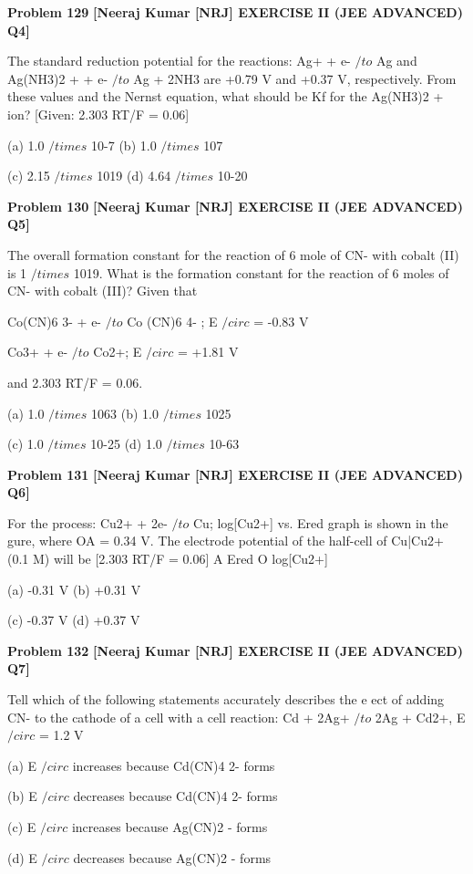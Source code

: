 \begin{problembox}
\textbf{Problem 129} \hfill \textbf{[Neeraj Kumar [NRJ] EXERCISE II (JEE ADVANCED) Q4]}
\label{q:ext-nrj_all_questions-129}

The 
standard 
reduction 
potential 
for 
the 
reactions: Ag+ + e- $/to$ Ag and Ag(NH3)2
+  + e- $/to$ 
Ag + 2NH3 are +0.79 V and +0.37 V, respectively. 
From these values and the Nernst equation, what 
should be Kf for the Ag(NH3)2
+ ion? [Given: 2.303
RT/F = 0.06]
 
 (a) 1.0 $/times$ 10-7 
(b) 1.0 $/times$ 107
 
 (c) 2.15 $/times$ 1019 
(d) 4.64 $/times$ 10-20
\end{problembox}

\begin{problembox}
\textbf{Problem 130} \hfill \textbf{[Neeraj Kumar [NRJ] EXERCISE II (JEE ADVANCED) Q5]}
\label{q:ext-nrj_all_questions-130}

The overall formation constant for the reaction of 
6 mole of CN- with cobalt (II) is 1 $/times$ 1019. What is 
the formation constant for the reaction of 6 moles 
of CN- with cobalt (III)? Given that
 
   Co(CN)6
3- + e- $/to$ Co (CN)6
4- ; E $/circ$ = -0.83 V
 
   Co3+ + e- $/to$ Co2+; E $/circ$ = +1.81 V
 
  and 2.303 RT/F = 0.06.
 
 (a) 1.0 $/times$ 1063 
(b) 1.0 $/times$ 1025
 
 (c) 1.0 $/times$ 10-25 
(d) 1.0 $/times$ 10-63
\end{problembox}

\begin{problembox}
\textbf{Problem 131} \hfill \textbf{[Neeraj Kumar [NRJ] EXERCISE II (JEE ADVANCED) Q6]}
\label{q:ext-nrj_all_questions-131}

For the process: Cu2+ + 2e- $/to$ Cu; log[Cu2+] vs. 
Ered graph is shown in the   gure, where OA = 
0.34 V. The electrode potential of the half-cell of 
Cu|Cu2+ (0.1 M) will be [2.303 RT/F = 0.06]
A
Ered
O
log[Cu2+]
 
 (a) -0.31 V 
(b) +0.31 V
 
 (c) -0.37 V 
(d) +0.37 V
\end{problembox}

\begin{problembox}
\textbf{Problem 132} \hfill \textbf{[Neeraj Kumar [NRJ] EXERCISE II (JEE ADVANCED) Q7]}
\label{q:ext-nrj_all_questions-132}

Tell which of the following statements accurately 
describes the e  ect of adding CN- to the cathode 
of a cell with a cell reaction: Cd + 2Ag+ $/to$ 2Ag + 
Cd2+, E $/circ$ = 1.2 V
 
 (a)  E $/circ$ increases because Cd(CN)4
2- forms
 
 (b)  E $/circ$ decreases because Cd(CN)4
2- forms
 
 (c) E $/circ$ increases because Ag(CN)2
- forms
 
 (d)  E $/circ$ decreases because Ag(CN)2
- forms
\end{problembox}

